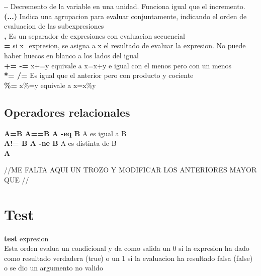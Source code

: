\documentclass[11pt]{article}
\begin{document}
 \textbf{--} \hspace{2cm}  Decremento de la variable en una unidad. Funciona igual que el incremento.\\
 
 \textbf{(...)} \hspace{2cm}  Indica una agrupacion para evaluar conjuntamente, indicando el orden de evaluacion de las subexpresiones\\
 
 \textbf{,} \hspace{2cm}  Es un separador de expresiones con evaluacion secuencial\\
 
 \textbf{=} \hspace{2cm}  si x=expresion, se asigna a x el resultado de evaluar la expresion. No puede haber huecos en blanco a los lados del igual\\
 
 \textbf{+= -=} \hspace{2cm} x+=y equivale a x=x+y e igual con el menos pero con un menos \\
 
 \textbf{*= /=} \hspace{2cm}  Es igual que el anterior pero con producto y cociente \\
 
 \textbf{\%=} \hspace{2cm}  x\%=y equivale a x=x\%y\\
 
 
 \subsection{Operadores relacionales}
 
 \textbf{A=B A==B A -eq B} \hspace{2cm}  A es igual a B\\
 
 \textbf{A!= B A -ne B } \hspace{2cm}  A es distinta de B\\
 
 \textbf{A }
 
 //ME FALTA AQUI UN TROZO Y MODIFICAR LOS ANTERIORES MAYOR QUE //
 
 
 \section{Test}
 
 \textbf{test} expresion \\
 Esta orden evalua un condicional y da como salida un 0 si la expresion ha dado como resultado verdadera (true) o un 1 si la evaluacion ha resultado falsa (false) o se dio un argumento no valido \\
 
\end{document}

